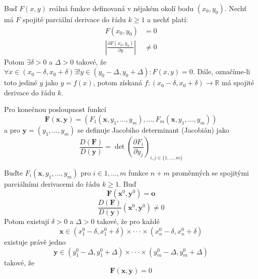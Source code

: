 \documentclass[../main.tex]{subfiles}
\begin{document}
\begin{theorem}
	Buď $F(x,y)$ reálná funkce definovaná v nějakém okolí bodu $(x_0, y_0)$. Nechť má $F$ spojité parciální
	derivace do řádu $k \geq 1$ a nechť platí:
	\begin{align*}
	    F(x_0, y_0) &= 0\\
	    \left| \frac{\partial F(x_0,y_0)}{\partial y} \right| &\neq 0
	\end{align*}
	Potom $ \exists \delta > 0$ a $\Delta > 0$ takové, že
	$\forall x \in (x_0 - \delta , x_0 + \delta) \exists! y \in (y_0 - \Delta , y_0 + \Delta): F(x,y) = 0$.
	Dále, označíme-li toto jediné $y$ jako $y = f(x)$, potom získaná
	$f: (x_0 - \delta , x_0 + \delta ) \to \mathbb{R}$ má spojité derivace do řádu $k$.
\end{theorem}



\begin{definition}
	Pro konečnou posloupnost funkcí
	\[ \mathbf{F}(\mathbf{x}, \mathbf{y}) =
	(F_1(\mathbf{x}, y_1, ..., y_m), ... , F_m(\mathbf{x}, y_1, ..., y_m)) \]
	a pro $\mathbf{y} = (y_1, ... , y_m)$ se definuje Jacobiho determinant (Jacobián) jako
	\[ \frac{D(\mathbf{F})}{D(\mathbf{y})} =
	\det \left( \frac{\partial F_i}{\partial y_j} \right)_{i,j \in \{ 1, ... , m\}} \]
\end{definition}

\begin{theorem}
	Buďte $F_i(\mathbf{x}, y_1, ... , y_m)$ pro $i \in {1, ... , m}$ funkce $n+m$ proměnných se spojitými
	parciálními derivacemi do řádu $k \geq 1$. Buď \[ \mathbf{F}(\mathbf{x}^0, \mathbf{y}^0) = \mathbf{o} \]
	\[ \frac{D(\mathbf{F})}{D(\mathbf{y})}(\mathbf{x}^0, \mathbf{y}^0) \neq 0 \]
	Potom existují $\delta > 0$ a $\Delta > 0$ takové, že pro každé
	\[ \mathbf{x} \in (x_{1}^{0} - \delta, x_{1}^{0} + \delta) \times \cdot \cdot \cdot \times 
	(x_{n}^{0} - \delta, x_{n}^{0} + \delta)\]
	existuje právě jedno
	\[ \mathbf{y} \in (y_{1}^{0} - \Delta , y_{1}^{0} + \Delta) \times \cdot \cdot \cdot \times
	(y_{m}^{0} - \Delta , y_{m}^{0} + \Delta) \]
	takové, že
	\[ \mathbf{F}(\mathbf{x}, \mathbf{y}) = 0 \]
\end{theorem}

\end{document}
